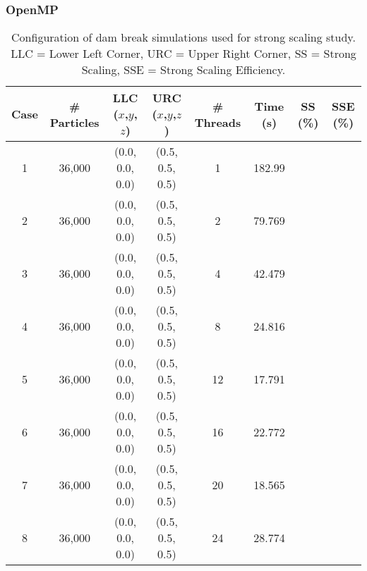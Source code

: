 \documentclass{scrartcl}
\begin{document}
    \subsubsection{OpenMP}
    \begin{table}
        \begin{tabular}{| c | c | c | c | c | c | c | c |}
            \hline
            Case & \# Particles & LLC ($x$,$y$,$z$) & URC ($x$,$y$,$z$) & \# Threads & Time (s) & SS (\%)& SSE (\%) \\ \hline
            1 & 36,000 & (0.0, 0.0, 0.0) & (0.5, 0.5, 0.5) &  1 & 182.99 & & \\ \hline		  		
            2 & 36,000 & (0.0, 0.0, 0.0) & (0.5, 0.5, 0.5) &  2 & 79.769 & & \\ \hline		  		
            3 & 36,000 & (0.0, 0.0, 0.0) & (0.5, 0.5, 0.5) &  4 & 42.479 & & \\ \hline		  		
            4 & 36,000 & (0.0, 0.0, 0.0) & (0.5, 0.5, 0.5) &  8 & 24.816 & & \\ \hline		  		
            5 & 36,000 & (0.0, 0.0, 0.0) & (0.5, 0.5, 0.5) & 12 & 17.791 & & \\ \hline		  		
            6 & 36,000 & (0.0, 0.0, 0.0) & (0.5, 0.5, 0.5) & 16 & 22.772 & & \\ \hline		  		
            7 & 36,000 & (0.0, 0.0, 0.0) & (0.5, 0.5, 0.5) & 20 & 18.565 & & \\ \hline		  		
            8 & 36,000 & (0.0, 0.0, 0.0) & (0.5, 0.5, 0.5) & 24 & 28.774 & & \\ \hline		  		
        \end{tabular}
        \caption{Configuration of dam break simulations used for strong scaling study. LLC = Lower Left Corner, URC = Upper Right Corner, SS = Strong Scaling, SSE = Strong Scaling Efficiency.}
        \label{tab:ss}
    \end{table}
  
\end{document}
